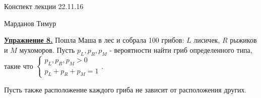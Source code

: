 \documentclass[a4paper]{article}
\begin{document}
 \begin{center}
 {\Large{Конспект лекции 22.11.16}}
 \end{center}
  \begin{center}
 {\large{Марданов Тимур}}
 \end{center}
 \par {\bf\underline{Упражнение 8.}} Пошла Маша в лес и собрала 100 грибов: $L$ лисичек, $R$ рыжиков и $M$ мухоморов. Пусть $p_{L}, p_{R}, p_{M}$ - вероятности найти гриб определенного типа, такие что $\begin{cases} p_{L}, p_{R}, p_{M} > 0\\p_{L} + p_{R} +p_{M} = 1\end{cases}$.

 Пусть также расположение каждого гриба не зависит от расположения других.
\end{document}
